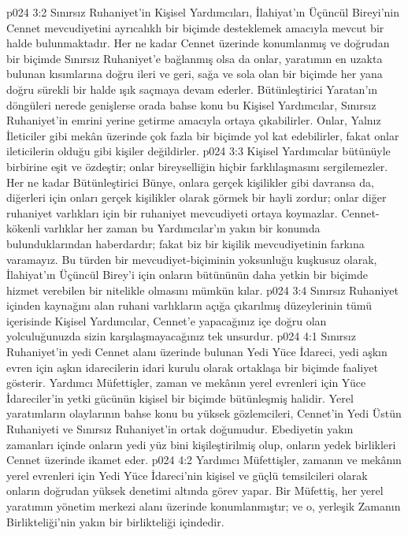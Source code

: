 \vs p024 3:2 Sınırsız Ruhaniyet’in Kişisel Yardımcıları, İlahiyat’ın Üçüncül Bireyi’nin Cennet mevcudiyetini ayrıcalıklı bir biçimde desteklemek amacıyla mevcut bir halde bulunmaktadır. Her ne kadar Cennet üzerinde konumlanmış ve doğrudan bir biçimde Sınırsız Ruhaniyet’e bağlanmış olsa da onlar, yaratımın en uzakta bulunan kısımlarına doğru ileri ve geri, sağa ve sola olan bir biçimde her yana doğru sürekli bir halde ışık saçmaya devam ederler. Bütünleştirici Yaratan’ın döngüleri nerede genişlerse orada bahse konu bu Kişisel Yardımcılar, Sınırsız Ruhaniyet’in emrini yerine getirme amacıyla ortaya çıkabilirler. Onlar, Yalnız İleticiler gibi mekân üzerinde çok fazla bir biçimde yol kat edebilirler, fakat onlar ileticilerin olduğu gibi kişiler değildirler.
\vs p024 3:3 Kişisel Yardımcılar bütünüyle birbirine eşit ve özdeştir; onlar bireyselliğin hiçbir farklılaşmasını sergilemezler. Her ne kadar Bütünleştirici Bünye, onlara gerçek kişilikler gibi davransa da, diğerleri için onları gerçek kişilikler olarak görmek bir hayli zordur; onlar diğer ruhaniyet varlıkları için bir ruhaniyet mevcudiyeti ortaya koymazlar. Cennet\hyp{}kökenli varlıklar her zaman bu Yardımcılar’ın yakın bir konumda bulunduklarından haberdardır; fakat biz bir kişilik mevcudiyetinin farkına varamayız. Bu türden bir mevcudiyet\hyp{}biçiminin yoksunluğu kuşkusuz olarak, İlahiyat’ın Üçüncül Birey’i için onların bütününün daha yetkin bir biçimde hizmet verebilen bir nitelikle olmasını mümkün kılar.
\vs p024 3:4 Sınırsız Ruhaniyet içinden kaynağını alan ruhani varlıkların açığa çıkarılmış düzeylerinin tümü içerisinde Kişisel Yardımcılar, Cennet’e yapacağınız içe doğru olan yolculuğunuzda sizin karşılaşmayacağınız tek unsurdur.
\vs p024 4:1 Sınırsız Ruhaniyet’in yedi Cennet alanı üzerinde bulunan Yedi Yüce İdareci, yedi aşkın evren için aşkın idarecilerin idari kurulu olarak ortaklaşa bir biçimde faaliyet gösterir. Yardımcı Müfettişler, zaman ve mekânın yerel evrenleri için Yüce İdareciler’in yetki gücünün kişisel bir biçimde bütünleşmiş halidir. Yerel yaratımların olaylarının bahse konu bu yüksek gözlemcileri, Cennet’in Yedi Üstün Ruhaniyeti ve Sınırsız Ruhaniyet’in ortak doğumudur. Ebediyetin yakın zamanları içinde onların yedi yüz bini kişileştirilmiş olup, onların yedek birlikleri Cennet üzerinde ikamet eder.
\vs p024 4:2 Yardımcı Müfettişler, zamanın ve mekânın yerel evrenleri için Yedi Yüce İdareci’nin kişisel ve güçlü temsilcileri olarak onların doğrudan yüksek denetimi altında görev yapar. Bir Müfettiş, her yerel yaratımın yönetim merkezi alanı üzerinde konumlanmıştır; ve o, yerleşik Zamanın Birlikteliği’nin yakın bir birlikteliği içindedir.
